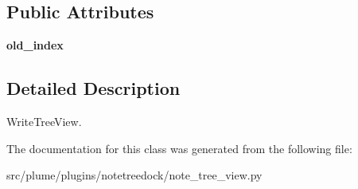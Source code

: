 \subsection*{Public Attributes}
\begin{DoxyCompactItemize}
\item 
{\bfseries old\+\_\+index}\hypertarget{classplume-creator_1_1src_1_1plume_1_1plugins_1_1notetreedock_1_1note__tree__view_1_1_note_tree_view_a88e62ac49d6f7121e48dd013dbf8e579}{}\label{classplume-creator_1_1src_1_1plume_1_1plugins_1_1notetreedock_1_1note__tree__view_1_1_note_tree_view_a88e62ac49d6f7121e48dd013dbf8e579}

\end{DoxyCompactItemize}


\subsection{Detailed Description}
Write\+Tree\+View. 

The documentation for this class was generated from the following file\+:\begin{DoxyCompactItemize}
\item 
src/plume/plugins/notetreedock/note\+\_\+tree\+\_\+view.\+py\end{DoxyCompactItemize}
